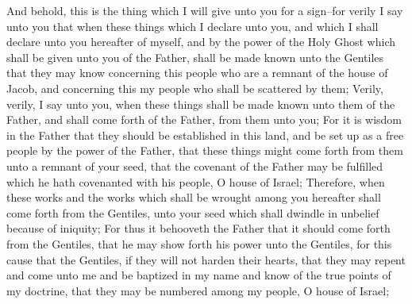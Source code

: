And behold, this is the thing which I will give unto you for a sign--for verily I say unto you that when these things which I declare unto you, and which I shall declare unto you hereafter of myself, and by the power of the Holy Ghost which shall be given unto you of the Father, shall be made known unto the Gentiles that they may know concerning this people who are a remnant of the house of Jacob, and concerning this my people who shall be scattered by them;
\bverse \iffalse Verily, verily, I say unto you, when these things shall be made known unto them of the Father, and shall come forth of the Father, from them unto you; \fi
Verily, verily, I say unto you, when these things shall be made known unto them of the Father, and shall come forth of the Father, from them unto you;
\bverse \iffalse For it is wisdom in the Father that they should be established in this land, and be set up as a free people by the power of the Father, that these things might come forth from them unto a remnant of your seed, that the covenant of the Father may be fulfilled which he hath covenanted with his people, O house of Israel; \fi
For it is wisdom in the Father that they should be established in this land, and be set up as a free people by the power of the Father, that these things might come forth from them unto a remnant of your seed, that the covenant of the Father may be fulfilled which he hath covenanted with his people, O house of Israel;
\bverse \iffalse Therefore, when these works and the works which shall be wrought among you hereafter shall come forth from the Gentiles, unto your seed which shall dwindle in unbelief because of iniquity; \fi
Therefore, when these works and the works which shall be wrought among you hereafter shall come forth from the Gentiles, unto your seed which shall dwindle in unbelief because of iniquity;
\bverse \iffalse For thus it behooveth the Father that it should come forth from the Gentiles, that he may show forth his power unto the Gentiles, for this cause that the Gentiles, if they will not harden their hearts, that they may repent and come unto me and be baptized in my name and know of the true points of my doctrine, that they may be numbered among my people, O house of Israel; \fi
For thus it behooveth the Father that it should come forth from the Gentiles, that he may show forth his power unto the Gentiles, for this cause that the Gentiles, if they will not harden their hearts, that they may repent and come unto me and be baptized in my name and know of the true points of my doctrine, that they may be numbered among my people, O house of Israel;

